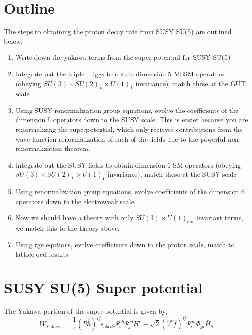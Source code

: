 \documentclass[aps,onecolumn,twoside,secnumarabic,balancelastpage,amsmath,amssymb,nofootinbib,hyperref=pdftex]{revtex4}
\begin{document}
\title{}
\author         {Noah Steinberg}
\date{\today}

\maketitle

\section{Outline}

The steps to obtaining the proton decay rate from SUSY SU(5) are outlined below,

\begin{enumerate}
\item Write down the yukawa terms from the super potential for SUSY SU(5)
\item Integrate out the triplet higgs to obtain dimension 5 MSSM operators (obeying $SU(3) \times SU(2)_{L} \times U(1)_{Y}$ invariance), match these at the GUT scale
\item Using SUSY renormalization group equations, evolve the coefficients of the dimension 5 operators down to the SUSY scale. This is easier because you are renormalizing the superpotential, which only recieves contributions from the wave function renormalization of each of the fields due to the powerful non renormalization theorem. 
\item Integrate out the SUSY fields to obtain dimension 6 SM operators (obeying $SU(3) \times SU(2)_{L} \times U(1)_{Y}$ invariance), match these at the SUSY scale
\item Using renormalization group equations, evolve coefficients of the dimension 6 operators down to the electroweak scale.
\item Now we should have a theory with only $SU(3) \times U(1)_{em}$ invariant terms, we match this to the theory above.
\item Using rge equtions, evolve coefficients down to the proton scale, match to lattice qcd results
\end{enumerate}

\section{SUSY SU(5) Super potential}
The Yukawa portion of the super potential is given by,
\begin{equation}
W_{\text{Yukawa}} = \frac{1}{4}(P\hat{h})^{ij}\epsilon_{abcde}\Psi^{ab}_{i}\Psi^{cd}_{j}H^{e} - \sqrt{2}(V^{*}\hat{f})^{ij}\Psi^{ab}_{i}\Phi_{ja}\bar{H}_{b}
\end{equation}
\end{document}
